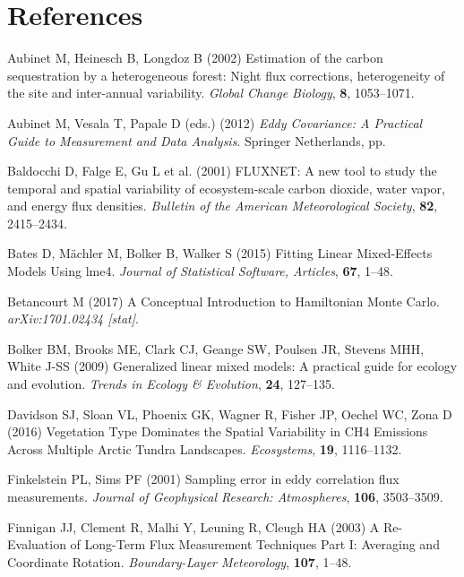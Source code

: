 \section*{References}\label{references}

\hypertarget{refs}{}
\hypertarget{ref-Aubinet2002}{}
Aubinet M, Heinesch B, Longdoz B (2002) Estimation of the carbon
sequestration by a heterogeneous forest: Night flux corrections,
heterogeneity of the site and inter-annual variability. \emph{Global
Change Biology}, \textbf{8}, 1053--1071.

\hypertarget{ref-Aubinet2012}{}
Aubinet M, Vesala T, Papale D (eds.) (2012) \emph{\textup{Eddy
Covariance: A Practical Guide to Measurement and Data Analysis}}.
Springer Netherlands, pp.

\hypertarget{ref-Baldocchi2001}{}
Baldocchi D, Falge E, Gu L et al. (2001) FLUXNET: A new tool to study
the temporal and spatial variability of ecosystem-scale carbon dioxide,
water vapor, and energy flux densities. \emph{Bulletin of the American
Meteorological Society}, \textbf{82}, 2415--2434.

\hypertarget{ref-Bates2015}{}
Bates D, Mächler M, Bolker B, Walker S (2015) Fitting Linear
Mixed-Effects Models Using lme4. \emph{Journal of Statistical Software,
Articles}, \textbf{67}, 1--48.

\hypertarget{ref-Betancourt2017}{}
Betancourt M (2017) A Conceptual Introduction to Hamiltonian Monte
Carlo. \emph{arXiv:1701.02434 {[}stat{]}}.

\hypertarget{ref-Bolker2009}{}
Bolker BM, Brooks ME, Clark CJ, Geange SW, Poulsen JR, Stevens MHH,
White J-SS (2009) Generalized linear mixed models: A practical guide for
ecology and evolution. \emph{Trends in Ecology \& Evolution},
\textbf{24}, 127--135.

\hypertarget{ref-Davidson2016}{}
Davidson SJ, Sloan VL, Phoenix GK, Wagner R, Fisher JP, Oechel WC, Zona
D (2016) Vegetation Type Dominates the Spatial Variability in CH4
Emissions Across Multiple Arctic Tundra Landscapes. \emph{Ecosystems},
\textbf{19}, 1116--1132.

\hypertarget{ref-Finkelstein2001}{}
Finkelstein PL, Sims PF (2001) Sampling error in eddy correlation flux
measurements. \emph{Journal of Geophysical Research: Atmospheres},
\textbf{106}, 3503--3509.

\hypertarget{ref-Finnigan2003}{}
Finnigan JJ, Clement R, Malhi Y, Leuning R, Cleugh HA (2003) A
Re-Evaluation of Long-Term Flux Measurement Techniques Part I: Averaging
and Coordinate Rotation. \emph{Boundary-Layer Meteorology},
\textbf{107}, 1--48.

